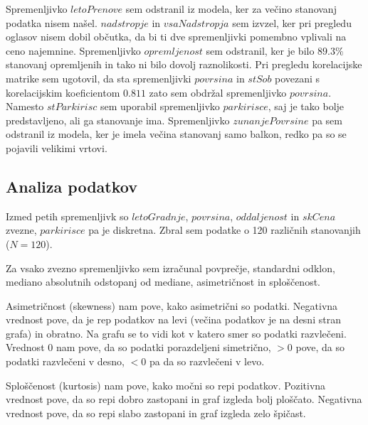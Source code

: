 \documentclass[a4paper, 12pt]{article}
\begin{document}
Spremenljivko $ letoPrenove $ sem odstranil iz modela, ker za večino
stanovanj podatka nisem našel. $ nadstropje $ in $ vsaNadstropja $
sem izvzel, ker pri pregledu oglasov nisem dobil občutka, da bi ti dve
spremenljivki pomembno vplivali na ceno najemnine. Spremenljivko
$ opremljenost $ sem odstranil, ker je bilo $ 89.3\% $ stanovanj
opremljenih in tako ni bilo dovolj raznolikosti. Pri pregledu korelacijske
matrike sem ugotovil, da sta spremenljivki $ povrsina $ in
$ stSob $ povezani s korelacijskim koeficientom $ 0.811 $ zato sem obdržal
spremenljivko $ povrsina $. Namesto $ stParkirisc $ sem uporabil
spremenljivko $ parkirisce $, saj je tako bolje predstavljeno, ali ga
stanovanje ima. Spremenljivko $ zunanjePovrsine $ pa sem  odstranil iz
modela, ker je imela večina stanovanj samo balkon, redko pa so se pojavili
velikimi vrtovi.

\subsection{Analiza podatkov}

Izmed petih spremenljivk so $ letoGradnje $, $ povrsina $,
$ oddaljenost $ in $ skCena $ zvezne, $ parkirisce $ pa je
diskretna. Zbral sem podatke o 120 različnih stanovanjih ($ N = 120 $).

Za vsako zvezno spremenljivko sem izračunal povprečje, standardni odklon,
mediano absolutnih odstopanj od mediane, asimetričnost in sploščenost.

Asimetričnost (skewness) nam pove, kako asimetrični so podatki. Negativna
vrednost pove, da je rep podatkov na levi (večina podatkov je na desni stran
grafa) in obratno. Na grafu se to vidi kot v katero smer so podatki razvlečeni.
Vrednost $ 0 $ nam pove, da so podatki porazdeljeni simetrično, $ >0 $ pove, da
so podatki razvlečeni v desno, $ <0 $ pa da so razvlečeni v levo.

Sploščenost (kurtosis) nam pove, kako močni so repi podatkov. Pozitivna
vrednost pove, da so repi dobro zastopani in graf izgleda bolj ploščato.
Negativna vrednost pove, da so repi slabo zastopani in graf izgleda zelo
špičast.
\end{document}
